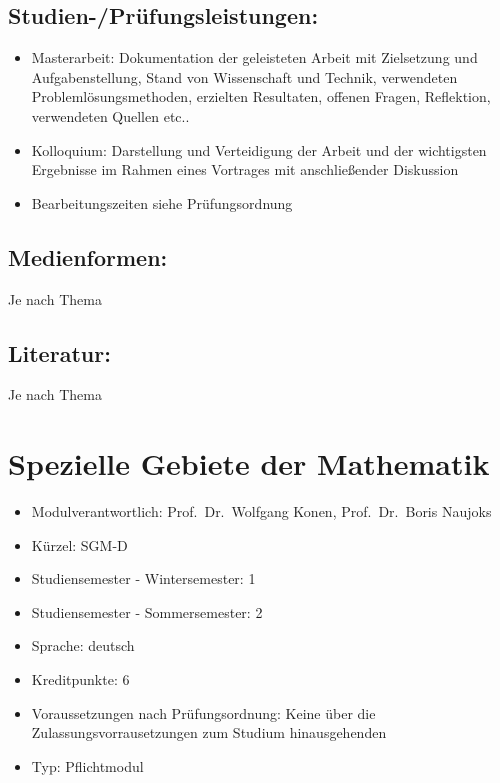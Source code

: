\section*{Studien-/Prüfungsleistungen:}\label{studien-pruxfcfungsleistungen-1}

\begin{itemize}
\item
  Masterarbeit: Dokumentation der geleisteten Arbeit mit Zielsetzung und
  Aufgabenstellung, Stand von Wissenschaft und Technik, verwendeten
  Problemlösungsmethoden, erzielten Resultaten, offenen Fragen,
  Reflektion, verwendeten Quellen etc..
\item
  Kolloquium: Darstellung und Verteidigung der Arbeit und der
  wichtigsten Ergebnisse im Rahmen eines Vortrages mit anschließender
  Diskussion
\item
  Bearbeitungszeiten siehe Prüfungsordnung
\end{itemize}

\section*{Medienformen:}\label{medienformen-1}

Je nach Thema

\section*{Literatur:}\label{literatur-1}

Je nach Thema

\chapter{Spezielle Gebiete der
Mathematik}\label{spezielle-gebiete-der-mathematik}

\begin{itemize}
\tightlist
\item
  Modulverantwortlich: Prof.~Dr.~Wolfgang Konen, Prof.~Dr.~Boris Naujoks
\item
  Kürzel: SGM-D
\item
  Studiensemester - Wintersemester: 1
\item
  Studiensemester - Sommersemester: 2
\item
  Sprache: deutsch
\item
  Kreditpunkte: 6
\item
  Voraussetzungen nach Prüfungsordnung: Keine über die
  Zulassungsvorrausetzungen zum Studium hinausgehenden
\item
  Typ: Pflichtmodul
\end{itemize}

